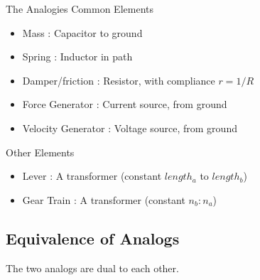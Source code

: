 \documentclass{../templates/topic}
\begin{document}
\begin{section}{The Analogies}
		Common Elements
		\begin{itemize}
			\item Mass : Capacitor to ground
			\item Spring : Inductor in path
			\item Damper/friction : Resistor, with compliance $r = 1/R$
			\item Force Generator : Current source, from ground
			\item Velocity Generator : Voltage source, from ground
		\end{itemize}
		
		Other Elements
		\begin{itemize}
			\item Lever : A transformer (constant $length_a$ to $length_b$)
			\item Gear Train : A transformer (constant $n_b : n_a$)
		\end{itemize}
		
	\subsection{Equivalence of Analogs}
		The two analogs are dual to each other.

\end{section}
\end{document}

